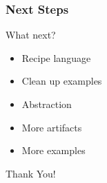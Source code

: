 \documentclass{beamer}
\begin{document}
\begin{frame}

\frametitle{Next Steps}


\begin{Large}
What next?
\end{Large}

\begin{itemize}
\item Recipe language %
\item Clean up examples
\item Abstraction
\item More artifacts
\item More examples
\end{itemize}
\end{frame}


\begin{frame}
\begin{center}
\Huge Thank You!
\end{center}
\end{frame}

\end{document}
